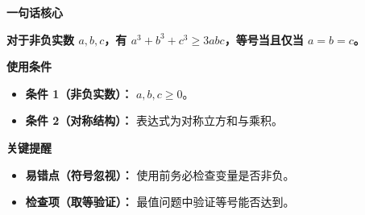 \begin{summarybox}
\textbf{\textcolor{CSummary}{一句话核心}}

\textbf{对于非负实数 $a, b, c$，有 $a^3+b^3+c^3 \geq 3abc$，等号当且仅当 $a=b=c$。}

\medskip
\textbf{\textcolor{CSummary}{使用条件}}
\begin{itemize}[leftmargin=*, itemsep=0.5em, topsep=0.4em]
    \item \textbf{条件 1（非负实数）：} $a, b, c \geq 0$。
    \item \textbf{条件 2（对称结构）：} 表达式为对称立方和与乘积。
\end{itemize}

\medskip
\textbf{\textcolor{CSummary}{关键提醒}}
\begin{itemize}[leftmargin=*, itemsep=0.5em, topsep=0.4em]
    \item \textbf{易错点（符号忽视）：} 使用前务必检查变量是否非负。
    \item \textbf{检查项（取等验证）：} 最值问题中验证等号能否达到。
\end{itemize}
\end{summarybox}

